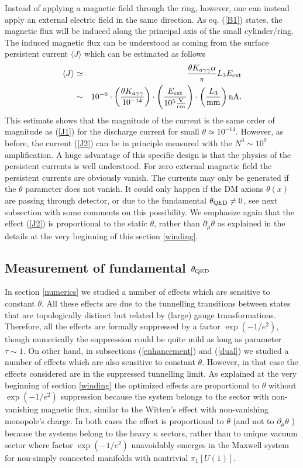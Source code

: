 \documentclass[ twocolumn,aps,prd,   
               preprintnumbers,numbers,sort&compress,nofootinbib,
                            showpacs,superscriptaddress,
               colorlinks,
               linkcolor=blue,   
               citecolor=blue]{revtex4-1}   \newcommand{\exclude}[1]{}
\newcommand{\be}{\begin{eqnarray}}
\newcommand{\ee}{\end{eqnarray}}
\def\la{\langle}
\def\ra{\rangle}
\begin{document}
 Instead of applying a magnetic field through the ring, however, one can instead apply an external electric field in the same direction. 
As  eq. (\ref{B1}) states, the   magnetic flux will be induced along the principal axis of the small cylinder/ring. The induced magnetic flux can be understood \cite{Zhitnitsky:2015fpa} as coming from the surface persistent current $\la J \ra$ which can be estimated as follows 
\be
\label{J2}
\la J\ra&\simeq& \frac{\theta K_{a\gamma\gamma}\alpha}{\pi} L_3 E_{\rm ext}\\ &\sim& 10^{-6}\cdot\left(\frac{\theta K_{a\gamma\gamma}}{10^{-14}}\right)\cdot  \left(\frac{E_{\rm ext}}{10^5\frac{\rm V}{\rm cm}}\right)\cdot  \left(\frac{L_3}{\rm mm}\right) {\rm nA}. \nonumber
\ee
This estimate shows that the magnitude of the current is the same order of magnitude as (\ref{J1}) for the discharge current  for   small $\theta\simeq 10^{-14}$. However, as before, the current (\ref{J2})    can be in principle measured  with  the   $N^3\sim 10^9$ amplification. A huge advantage of this specific design  is that the physics of the persistent currents is well understood.
For zero  external magnetic field the persistent currents are obviously vanish. The currents may only be generated  if the $\theta$ parameter does not vanish. It could only happen if  the DM axions $\theta(x)$ are passing through detector, or due to the fundamental $\theta_{\rm QED}\neq 0$, see next subsection with  some comments on this possibility.  We emphasize again that the effect (\ref{J2}) is proportional to the static $\theta$, rather than $\partial_{\mu}\theta$  as explained in the details at the very beginning of this section \ref{winding}. 
 
   
\subsection{Measurement of fundamental $\theta_{\rm QED}$\label{QED}}
In section \ref{numerics} we studied a number of effects which are sensitive to constant $\theta$.
All  these effects are due to the tunnelling transitions between states that are topologically distinct but related by (large) gauge transformations. Therefore, all the effects are  formally suppressed by a factor  $\exp(-1/e^2)$,  though numerically the suppression could be  quite mild as long as parameter $\tau \sim1$. On other hand, in subsections (\ref{enhancement}) and (\ref{dual}) we studied a number of effects which are also sensitive to constant $\theta$. However, in that case the effects considered are in the suppressed tunnelling limit. As explained at the very beginning of  section \ref{winding} the optimized effects are proportional to $\theta$    without  $  \exp(-1/e^2)$ suppression  because the system belongs to the  sector with non-vanishing magnetic flux, similar to the Witten's effect \cite{Witten:1979ey} with non-vanishing 
monopole's charge. In both cases the effect is proportional to $\theta$ (and not to $\partial_{\mu}\theta$ ) because   the  systems belong to the heavy $\kappa$ sectors, rather than to unique vacuum sector where  factor $\exp(-1/e^2)$ unavoidably   emerges in  the Maxwell system   for non-simply connected manifolds with nontrivial $\pi_1[U(1)]$. 
\end{document}
